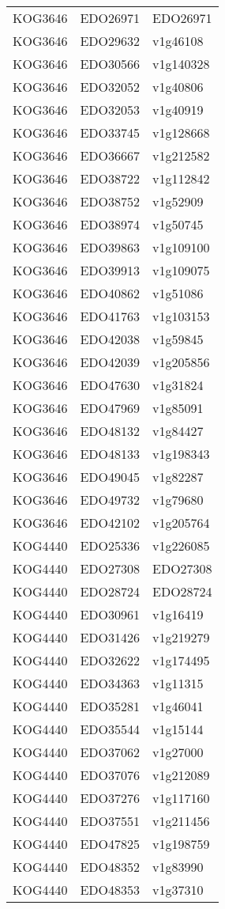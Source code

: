 \begin{longtable}[l]{lll}
\rowcolor{gray!6}  KOG3646 & EDO26971 & EDO26971\\
KOG3646 & EDO29632 & v1g46108\\
\rowcolor{gray!6}  KOG3646 & EDO30566 & v1g140328\\
KOG3646 & EDO32052 & v1g40806\\
\rowcolor{gray!6}  KOG3646 & EDO32053 & v1g40919\\
KOG3646 & EDO33745 & v1g128668\\
\rowcolor{gray!6}  KOG3646 & EDO36667 & v1g212582\\
KOG3646 & EDO38722 & v1g112842\\
\rowcolor{gray!6}  KOG3646 & EDO38752 & v1g52909\\
KOG3646 & EDO38974 & v1g50745\\
\rowcolor{gray!6}  KOG3646 & EDO39863 & v1g109100\\
KOG3646 & EDO39913 & v1g109075\\
\rowcolor{gray!6}  KOG3646 & EDO40862 & v1g51086\\
KOG3646 & EDO41763 & v1g103153\\
\rowcolor{gray!6}  KOG3646 & EDO42038 & v1g59845\\
KOG3646 & EDO42039 & v1g205856\\
\rowcolor{gray!6}  KOG3646 & EDO47630 & v1g31824\\
KOG3646 & EDO47969 & v1g85091\\
\rowcolor{gray!6}  KOG3646 & EDO48132 & v1g84427\\
KOG3646 & EDO48133 & v1g198343\\
\rowcolor{gray!6}  KOG3646 & EDO49045 & v1g82287\\
KOG3646 & EDO49732 & v1g79680\\
\rowcolor{gray!6}  KOG3646 & EDO42102 & v1g205764\\
KOG4440 & EDO25336 & v1g226085\\
\rowcolor{gray!6}  KOG4440 & EDO27308 & EDO27308\\
KOG4440 & EDO28724 & EDO28724\\
\rowcolor{gray!6}  KOG4440 & EDO30961 & v1g16419\\
KOG4440 & EDO31426 & v1g219279\\
\rowcolor{gray!6}  KOG4440 & EDO32622 & v1g174495\\
KOG4440 & EDO34363 & v1g11315\\
\rowcolor{gray!6}  KOG4440 & EDO35281 & v1g46041\\
KOG4440 & EDO35544 & v1g15144\\
\rowcolor{gray!6}  KOG4440 & EDO37062 & v1g27000\\
KOG4440 & EDO37076 & v1g212089\\
\rowcolor{gray!6}  KOG4440 & EDO37276 & v1g117160\\
KOG4440 & EDO37551 & v1g211456\\
\rowcolor{gray!6}  KOG4440 & EDO47825 & v1g198759\\
KOG4440 & EDO48352 & v1g83990\\
\rowcolor{gray!6}  KOG4440 & EDO48353 & v1g37310\\
\bottomrule
\end{longtable}
